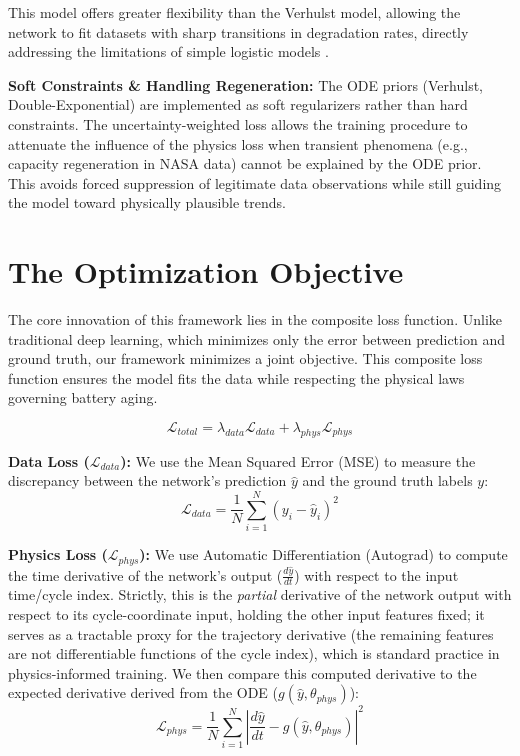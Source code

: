 This model offers greater flexibility than the Verhulst model, allowing the network to fit datasets with sharp transitions in degradation rates, directly addressing the limitations of simple logistic models \cite{wang_pinn}.

\textbf{Soft Constraints \& Handling Regeneration:} The ODE priors (Verhulst, Double-Exponential) are implemented as soft regularizers rather than hard constraints. The uncertainty-weighted loss allows the training procedure to attenuate the influence of the physics loss when transient phenomena (e.g., capacity regeneration in NASA data) cannot be explained by the ODE prior. This avoids forced suppression of legitimate data observations while still guiding the model toward physically plausible trends.

\section{The Optimization Objective}
\label{sec:optimization_objective}

The core innovation of this framework lies in the composite loss function. Unlike traditional deep learning, which minimizes only the error between prediction and ground truth, our framework minimizes a joint objective. This composite loss function ensures the model fits the data while respecting the physical laws governing battery aging.

\begin{equation}
    \mathcal{L}_{total} = \lambda_{data}\mathcal{L}_{data} + \lambda_{phys}\mathcal{L}_{phys}
    \label{eq:composite_loss}
\end{equation}


\textbf{Data Loss ($\mathcal{L}_{data}$):} We use the Mean Squared Error (MSE) to measure the discrepancy between the network's prediction $\hat{y}$ and the ground truth labels $y$:
\begin{equation}
    \mathcal{L}_{data} = \frac{1}{N} \sum_{i=1}^{N} (y_i - \hat{y}_i)^2
\end{equation}

\textbf{Physics Loss ($\mathcal{L}_{phys}$):} We use Automatic Differentiation (Autograd) to compute the time derivative of the network's output ($\frac{d\hat{y}}{dt}$) with respect to the input time/cycle index. Strictly, this is the \emph{partial} derivative of the network output with respect to its cycle-coordinate input, holding the other input features fixed; it serves as a tractable proxy for the trajectory derivative (the remaining features are not differentiable functions of the cycle index), which is standard practice in physics-informed training. We then compare this computed derivative to the expected derivative derived from the ODE ($g(\hat{y}, \theta_{phys})$):
\begin{equation}
    \mathcal{L}_{phys} = \frac{1}{N} \sum_{i=1}^{N} \left| \frac{d\hat{y}}{dt} - g(\hat{y}, \theta_{phys}) \right|^2
\end{equation}

